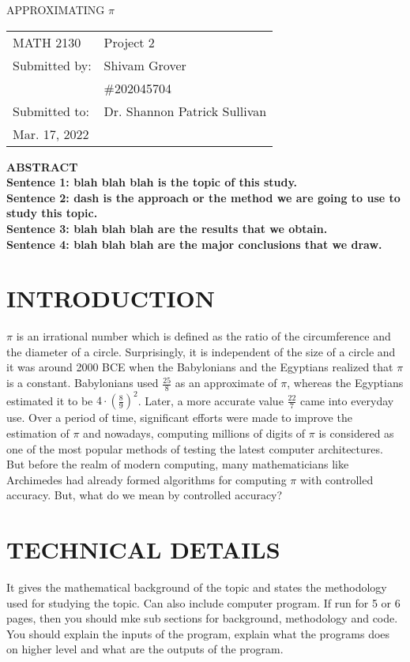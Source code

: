 \documentclass[12pt]{article}
\begin{document}
\begin{titlepage}
\begin{center}
\large APPROXIMATING $\displaystyle \pi$
\end{center}
\vspace{6cm}
\hfill\begin{tabular}{ll}
MATH 2130 & Project 2 \\
Submitted by: & Shivam Grover \\
& \#202045704 \\
Submitted to: & Dr. Shannon Patrick Sullivan \\
Mar. 17, 2022

\end{tabular}
\end{titlepage}

\bf{ABSTRACT} \\
Sentence 1: blah blah blah is the topic of this study.\\
Sentence 2: dash is the approach or the method we are going to use to study this topic.\\
Sentence 3: blah blah blah are the results that we obtain.\\
Sentence 4: blah blah blah are the major conclusions that we draw.\\

\section {INTRODUCTION}
$\pi$ is an irrational number which is defined as the ratio of the circumference and the diameter of a circle. Surprisingly, it is independent of the size of a circle and it was around 2000 BCE when the Babylonians and the Egyptians realized that $\pi$ is a constant. Babylonians used $\frac{25}{8}$ as an approximate of $\pi$, whereas the Egyptians estimated it to be $4\cdot(\frac{8}{9})^2$. Later, a more accurate value $\frac{22}{7}$ came into everyday use. Over a period of time, significant efforts were made to improve the estimation of $\pi$ and nowadays, computing millions of digits of $\pi$  is considered as one of the most popular methods of testing the latest computer architectures. But before the realm of modern computing, many mathematicians like Archimedes had already formed algorithms for computing $\pi$ with controlled accuracy. But, what do we mean by controlled accuracy?


\section {TECHNICAL DETAILS}
It gives the mathematical background of the topic and states the methodology used for studying the topic. Can also include computer program. If run for 5 or 6 pages, then you should mke sub sections for background, methodology and code. You should explain the inputs of the program, explain what the programs does on higher level and what are the outputs of the program.
\end{document}
